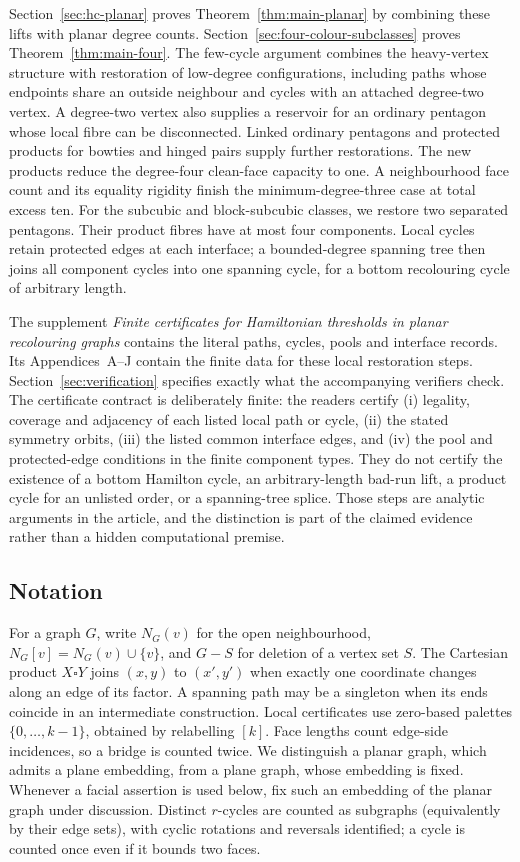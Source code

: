 \documentclass[11pt]{article}
\theoremstyle{remark}
\numberwithin{equation}{section}
\numberwithin{table}{section}
\begin{document}
Section~\ref{sec:hc-planar} proves Theorem~\ref{thm:main-planar} by
combining these lifts with planar degree counts. Section~\ref{sec:four-colour-subclasses}
proves Theorem~\ref{thm:main-four}. The few-cycle argument combines the
heavy-vertex structure with restoration of low-degree configurations, including
paths whose endpoints share an outside neighbour and cycles with an attached
degree-two vertex. A degree-two vertex also supplies a reservoir for an
ordinary pentagon whose local fibre can be disconnected. Linked ordinary
pentagons and protected products for bowties and hinged pairs supply
further restorations. The new products reduce the degree-four clean-face
capacity to one. A neighbourhood face count and its equality rigidity finish the
minimum-degree-three case at total excess ten. For the subcubic and block-subcubic classes,
we restore two separated pentagons. Their product fibres have at most
four components. Local cycles retain protected edges at each interface;
a bounded-degree spanning tree then joins all component cycles into
one spanning cycle, for a bottom recolouring cycle of arbitrary length.

The supplement \emph{Finite certificates for Hamiltonian thresholds in
planar recolouring graphs} contains the literal paths, cycles, pools
and interface records. Its Appendices~A--J contain the finite data for these
local restoration steps. Section~\ref{sec:verification} specifies exactly
what the accompanying verifiers check. The certificate contract is deliberately
finite: the readers certify (i) legality, coverage and adjacency of each
listed local path or cycle, (ii) the stated symmetry orbits, (iii) the listed
common interface edges, and (iv) the pool and protected-edge conditions in
the finite component types. They do not certify the existence of a bottom
Hamilton cycle, an arbitrary-length bad-run lift, a product cycle for an
unlisted order, or a spanning-tree splice. Those steps are analytic
arguments in the article, and the distinction is part of the claimed
evidence rather than a hidden computational premise.

\subsection{Notation}
For a graph $G$, write $N_G(v)$ for the open neighbourhood,
$N_G[v]=N_G(v)\cup\{v\}$, and $G-S$ for deletion of a vertex set $S$.
The Cartesian product $X\square Y$ joins $(x,y)$ to $(x',y')$ when
exactly one coordinate changes along an edge of its factor.
A spanning path may be a singleton when its ends coincide in an
intermediate construction. Local certificates use zero-based palettes
$\{0,\ldots,k-1\}$, obtained by relabelling $[k]$.
Face lengths count edge-side incidences, so a bridge is counted twice.
We distinguish a planar graph, which admits a plane embedding, from a
plane graph, whose embedding is fixed.  Whenever a facial assertion is
used below, fix such an embedding of the planar graph under discussion.
Distinct $r$-cycles are counted as subgraphs (equivalently by their edge
sets), with cyclic rotations and reversals identified; a cycle is counted
once even if it bounds two faces.
\end{document}
